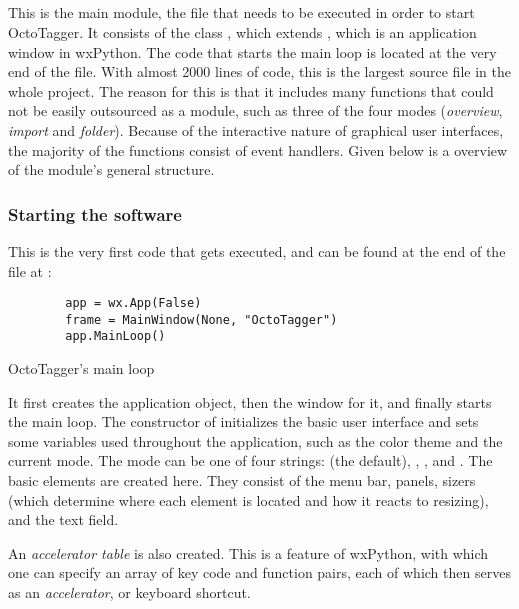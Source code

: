 \subsection{}
\def\kapitelautor{Erik Ritschl}

This is the main module, the file that needs to be executed in order to start OctoTagger. It consists of the class , which extends
, which is an application window in wxPython.
The code that starts the main loop is located at the very end of the file. %
With almost 2000 lines of code, this is the largest source file in the whole
project. The reason for this is that it includes many functions that could not
be easily outsourced as a module, such as three of the four modes (\emph{overview}, \emph{import} and \emph{folder}). Because of the interactive nature of graphical user interfaces, the majority of the  functions consist of event handlers. Given below is a overview of the
module's general structure.

\subsubsection{Starting the software}

This is the very first code that gets executed, and can be found at the end of the file at :

\begin{listing}[H]
    \begin{verbatim}
        app = wx.App(False)
        frame = MainWindow(None, "OctoTagger")
        app.MainLoop()
    \end{verbatim}
    \caption{OctoTagger's main loop}
\end{listing}

It first creates the application object, then the window for it, and finally starts the main loop. The constructor of  initializes the basic user interface and sets some variables
used throughout the application, such as the color theme and the current mode.
The mode can be one of four strings:  (the default),
, , and . The basic elements are created here. They consist of the menu bar, panels,
sizers (which determine where each element is located and how it reacts to
resizing), and the text field. %

An \emph{accelerator table} is also created. This is a feature
of wxPython, with which one can specify an array of key code
and function pairs, each of which then serves as an \emph{accelerator}, or
keyboard shortcut.

